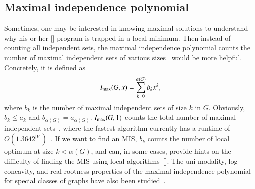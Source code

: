\documentclass[onefignum, onetabnum]{siamart190516}
\newcommand{\<}{\langle}
\renewcommand{\>}{\rangle}
\newcommand{\red}[1]{[{\bf  \color{red}{ST: #1}}]}
\newcommand{\blue}[1]{[{\bf  \color{blue}{JG: #1}}]}
\begin{document}
\subsection{Maximal independence polynomial}
Sometimes, one may be interested in knowing maximal solutions to understand why his or her \blue{Is this a convention to use both "he" and "her"?} program is trapped in a local minimum.
Then instead of counting all independent sets, the maximal independence polynomial counts the number of maximal independent sets of various sizes~\cite{Hu2017} would be more helpful.
 Concretely, it is defined as
\begin{equation}
I_{\rm max}(G, x) = \sum_{k=0}^{\alpha(G)} b_k x^k,
\end{equation}
where $b_k$ is the number of maximal independent sets of size $k$ in $G$.
Obviously, $b_{k} \leq a_{k}$ and $b_{\alpha(G)} = a_{\alpha(G)}$. $I_{\rm max}(G, 1)$ counts the total number of maximal independent sets~\cite{Gaspers2012, Manne2013}, where the fastest algorithm currently has a runtime of $O(1.3642^{|V|})$~\cite{Gaspers2012}.
If we want to find an MIS, $b_{k}$ counts the number of local optimum at size $k < \alpha(G)$, and can, in some cases, provide hints on the difficulty of finding the MIS using local algorithms~\red{cite experiment}.
The uni-modality, log-concavity, and real-rootness properties of the maximal independence polynomial for special classes of graphs have also been studied~\cite{Hu2017}. 
\end{document}
